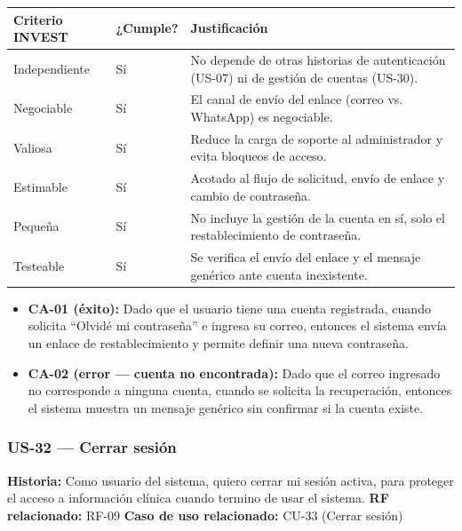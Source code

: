 \documentclass[11pt,a4paper]{article}
\providecommand{\tightlist}{%
	\setlength{\itemsep}{0pt}\setlength{\parskip}{0pt}}
\begin{document}
	\begin{longtable}{p{} p{} p{}}
		\toprule
		\textbf{Criterio INVEST} & \textbf{¿Cumple?} & \textbf{Justificación} \\
		\midrule
		\endhead
		Independiente & Sí & No depende de otras historias de autenticación (US-07) ni de gestión de cuentas (US-30). \\
		Negociable & Sí & El canal de envío del enlace (correo vs. WhatsApp) es negociable. \\
		Valiosa & Sí & Reduce la carga de soporte al administrador y evita bloqueos de acceso. \\
		Estimable & Sí & Acotado al flujo de solicitud, envío de enlace y cambio de contraseña. \\
		Pequeña & Sí & No incluye la gestión de la cuenta en sí, solo el restablecimiento de contraseña. \\
		Testeable & Sí & Se verifica el envío del enlace y el mensaje genérico ante cuenta inexistente. \\
		\bottomrule
	\end{longtable}
	
	\begin{itemize}
		\tightlist
		\item \textbf{CA-01 (éxito):} Dado que el usuario tiene una cuenta registrada, cuando solicita ``Olvidé mi contraseña'' e ingresa su correo, entonces el sistema envía un enlace de restablecimiento y permite definir una nueva contraseña.
		\item \textbf{CA-02 (error --- cuenta no encontrada):} Dado que el correo ingresado no corresponde a ninguna cuenta, cuando se solicita la recuperación, entonces el sistema muestra un mensaje genérico sin confirmar si la cuenta existe.
	\end{itemize}
	
	\subsubsection{US-32 --- Cerrar sesión}
	
	\textbf{Historia:} Como usuario del sistema, quiero cerrar mi sesión activa, para proteger el acceso a información clínica cuando termino de usar el sistema.
	\textbf{RF relacionado:} RF-09
	\textbf{Caso de uso relacionado:} CU-33 (Cerrar sesión)
	
\end{document}
